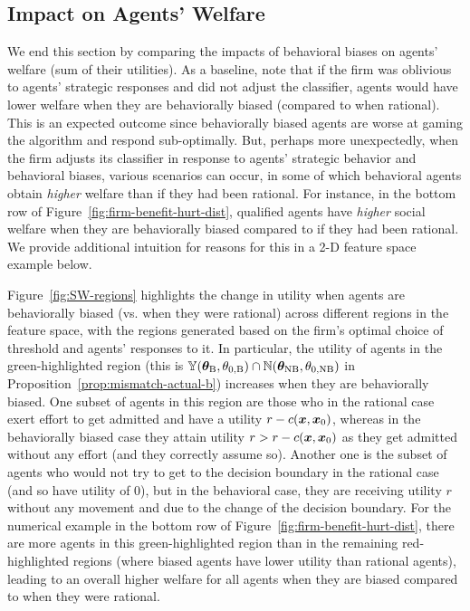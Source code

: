 \subsection{Impact on Agents' Welfare}\label{sec:agents_welfare}
We end this section by comparing the impacts of behavioral biases on agents' welfare (sum of their utilities). As a baseline, note that if the firm was oblivious to agents' strategic responses and did not adjust the classifier, agents would have lower welfare when they are behaviorally biased (compared to when rational). This is an expected outcome since behaviorally biased agents are worse at gaming the algorithm and respond sub-optimally. But, perhaps more unexpectedly, when the firm adjusts its classifier in response to agents' strategic behavior and behavioral biases, various scenarios can occur, in some of which behavioral agents obtain \emph{higher} welfare than if they had been rational. For instance, in the bottom row of Figure~\ref{fig:firm-benefit-hurt-dist}, qualified agents have \emph{higher} social welfare when they are behaviorally biased compared to if they had been rational. We provide additional intuition for reasons for this in a 2-D feature space example below. %

Figure~\ref{fig:SW-regions} highlights the change in utility when agents are behaviorally biased (vs. when they were rational) across different regions in the feature space, with the regions generated based on the firm's optimal choice of threshold and agents' responses to it. In particular, the utility of agents in the green-highlighted region (this is ${\mathbb{Y}}({\bm{\theta}}_\text{B}, \theta_{0,\text{B}}) \cap {\mathbb{N}}({\bm{\theta}}_\text{NB}, \theta_{0,\text{NB}})$ in Proposition~\ref{prop:mismatch-actual-b}) increases when they are behaviorally biased. One subset of agents in this region are those 
who in the rational case exert effort to get admitted and have a utility $r-c({\bm{x}},{\bm{x}}_0)$, whereas in the behaviorally biased case they attain utility $r > r-c({\bm{x}},{\bm{x}}_0)$ as they get admitted without any effort (and they correctly assume so). Another one is %
the subset of agents who would not try to get to the decision boundary in the rational case (and so have utility of $0$), but in the behavioral case, they are receiving utility $r$ without any movement and due to the change of the decision boundary. For the numerical example in the bottom row of Figure~\ref{fig:firm-benefit-hurt-dist}, there are more agents in this green-highlighted region than in the remaining red-highlighted regions (where biased agents have lower utility than rational agents), leading to an overall higher welfare for all agents when they are biased compared to when they were rational. 

